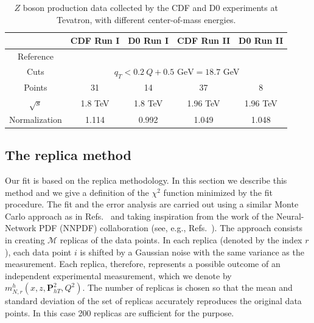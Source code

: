 \documentclass[aps,preprintnumbers,showpacs,nofootinbib,superscriptaddress,floatfix]{revtex4}
\newcommand{\Tperp}{T}
\begin{document}
\begin{table}[h!]
\begin{center}
\renewcommand{\tabcolsep}{0.4pc} %
\renewcommand{\arraystretch}{1.2} %
\begin{tabular}{|c|c|c|c|c|}
 \hline
 ~                        & CDF Run I    &  D0 Run I        & CDF Run II        & D0 Run II      \\
 \hline
 Reference        &\cite{Affolder:1999jh} &\cite{Abbott:1999wk}&\cite{Aaltonen:2012fi}&\cite{Abazov:2007ac} \\
\hline
Cuts             & \multicolumn{4}{c|}{$q_T< 0.2\ Q +0.5 \text{ GeV}=18.7$ GeV}                                  \\
\hline
 Points                   &      31      &   14             &       37          &        8       \\
 \hline
 $\sqrt{s}$               &      1.8 TeV &   1.8 TeV        &       1.96 TeV    &       1.96 TeV   \\
 \hline
Normalization        &  1.114       &    0.992          &       1.049        &       1.048    \\
\hline
\end{tabular}
\caption{$Z$ boson production data collected by the CDF and D0 experiments at Tevatron, with different center-of-mass energies.}
\label{t:data_Z}
\end{center}
\end{table}



\subsection{The replica method}
\label{ss:replica_method}


Our fit is based on the replica methodology. 
In this section we describe this method and we give a definition of the $\chi^2$ function minimized by the fit procedure.
The fit and the error analysis are 
carried out using a similar Monte Carlo approach as in Refs.~\cite{Bacchetta:2012ty,Signori:2013mda,Radici:2015mwa} and taking
inspiration from the work of the Neural-Network PDF (NNPDF) collaboration
(see, e.g., Refs.~\cite{Forte:2002fg,Ball:2008by,Ball:2010de}). 
The approach consists in creating $\mathcal{M}$ replicas of the data points. In each replica (denoted by the index $r$), each data point $i$ is shifted by a Gaussian noise with the same variance as the measurement. 
Each replica, therefore, represents a possible outcome of an independent experimental measurement, which we denote by $m_{N, r}^{h}(x, z, \bm{P}_{h\Tperp}^2, Q^2)$. 
The number of replicas is chosen so that the mean and standard deviation of
the set of replicas accurately reproduces the original data points. In this
case 200 replicas are sufficient for the purpose.
\end{document}
